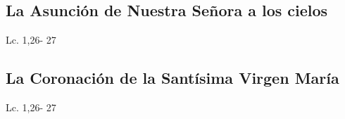 \documentclass[a4paper,11pt]{article}
\begin{document}
    \subsection*{\hfil La Asunción de Nuestra Señora a los cielos \hfil}
      \begin{multicols}{2}

      \columnbreak
                           
      \end{multicols}         
      \begin{center}
        Lc. 1,26- 27           
      \end{center}
    \subsection*{\hfil La Coronación de la Santísima Virgen María \hfil}
      \begin{multicols}{2}

      \columnbreak
                           
      \end{multicols}         
      \begin{center}
        Lc. 1,26- 27           
      \end{center}
\end{document}
